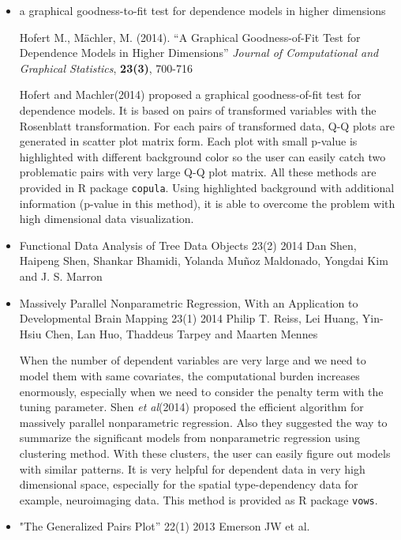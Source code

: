 \documentclass{article}
\begin{document}
\begin{itemize}

\item a graphical goodness-to-fit test for dependence models in higher dimensions

Hofert M., M\"{a}chler, M. (2014).
``A Graphical Goodness-of-Fit Test for
Dependence Models in Higher Dimensions''
{\em Journal of Computational and Graphical Statistics}, {\bf 23(3)}, 700-716

Hofert and Machler(2014) proposed a graphical goodness-of-fit test for dependence models.
It is based on pairs of transformed variables with the Rosenblatt transformation. For each pairs of transformed data, Q-Q plots are generated in scatter plot matrix form. Each plot with small p-value is highlighted with different background color so the user can easily catch two problematic pairs with very large Q-Q plot matrix. All these methods are provided in R package {\tt copula}. Using highlighted background with additional information (p-value in this method), it is able to overcome the problem with high dimensional data visualization.

\item Functional Data Analysis of Tree Data Objects 23(2) 2014
Dan Shen, Haipeng Shen, Shankar Bhamidi, Yolanda Muñoz Maldonado, Yongdai Kim and J. S. Marron



\item Massively Parallel Nonparametric Regression, With an Application to Developmental Brain Mapping 23(1) 2014
Philip T. Reiss, Lei Huang, Yin-Hsiu Chen, Lan Huo, Thaddeus Tarpey and Maarten Mennes


When the number of dependent variables are very large and we need to model them with same covariates,
 the computational burden increases enormously, especially when we need to consider the penalty term with the tuning parameter. Shen {\it et al}(2014) proposed  the efficient algorithm for massively parallel nonparametric regression.
 Also they suggested the way to summarize the significant models from nonparametric regression using clustering method. With these clusters, the user can easily figure out models with similar patterns. It is very helpful for dependent data in very high dimensional space, especially for the spatial type-dependency data for example, neuroimaging data. This method is provided as R package {\tt vows}.


\item "The Generalized Pairs Plot” 22(1) 2013 Emerson JW et al.


\end{itemize}
\end{document}
